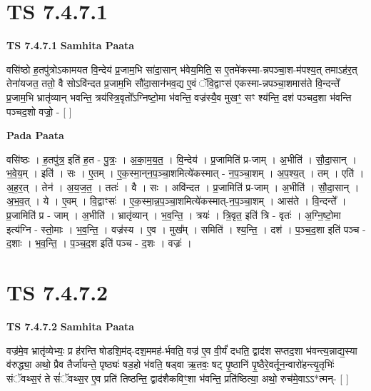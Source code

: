 \documentclass[17pt]{extarticle}
\begin{document}

\section{ TS 7.4.7.1 }

\textbf{TS 7.4.7.1 } \newline
\textbf{Samhita Paata} \newline

वसि॑ष्ठो ह॒तपु॑त्रोऽकामयत वि॒न्देय॑ प्र॒जाम॒भि सा॑दा॒सान् भ॑वेय॒मिति॒ स ए॒तमे॑कस्मा-न्नपञ्चा॒श-म॑पश्य॒त् तमाऽह॑र॒त् तेना॑यजत॒ ततो॒ वै सोऽवि॑न्दत प्र॒जाम॒भि सौ॑दा॒सान॑भव॒द्य ए॒वं ॅवि॒द्वाꣳस॑ एकस्मा-न्नपञ्चा॒शमास॑ते वि॒न्दन्ते᳚ प्र॒जाम॒भि भ्रातृ॑व्यान् भवन्ति॒ त्रय॑स्त्रि॒वृतो᳚ऽग्निष्टो॒मा भ॑वन्ति॒ वज्र॑स्यै॒व मुखꣳ॒॒ सꣳ श्य॑न्ति॒ दश॑ पञ्चद॒शा भ॑वन्ति पञ्चद॒शो वज्रो॒ - [  ] \newline

\textbf{Pada Paata} \newline

वसि॑ष्ठः । ह॒तपु॑त्र॒ इति॑ ह॒त - पु॒त्रः॒ । अ॒का॒म॒य॒त॒ । वि॒न्देय॑ । प्र॒जामिति॑ प्र-जाम् । अ॒भीति॑ । सौ॒दा॒सान् । भ॒वे॒य॒म् । इति॑ । सः । ए॒तम् । ए॒क॒स्मा॒न्‌न॒प॒ञ्चा॒शमित्ये॑कस्मात् - न॒प॒ञ्चा॒शम् । अ॒प॒श्य॒त् । तम् । एति॑ । अ॒ह॒र॒त् । तेन॑ । अ॒य॒ज॒त॒ । ततः॑ । वै । सः । अवि॑न्दत । प्र॒जामिति॑ प्र-जाम् । अ॒भीति॑ । सौ॒दा॒सान् । अ॒भ॒व॒त् । ये । ए॒वम् । वि॒द्वाꣳसः॑ । ए॒क॒स्मा॒न्न॒प॒ञ्चा॒शमित्ये॑कस्मात्-न॒प॒ञ्चा॒शम् । आस॑ते । वि॒न्दन्ते᳚ । प्र॒जामिति॑ प्र - जाम् । अ॒भीति॑ । भ्रातृ॑व्यान् । भ॒व॒न्ति॒ । त्रयः॑ । त्रि॒वृत॒ इति॑ त्रि - वृतः॑ । अ॒ग्नि॒ष्टो॒मा इत्य॑ग्नि - स्तो॒माः । भ॒व॒न्ति॒ । वज्र॑स्य । ए॒व । मुख᳚म् । समिति॑ । श्य॒न्ति॒ । दश॑ । प॒ञ्च॒द॒शा इति॑ पञ्च - द॒शाः । भ॒व॒न्ति॒ । प॒ञ्च॒द॒श इति॑ पञ्च - द॒शः । वज्रः॑ ।  \newline





\section{ TS 7.4.7.2 }

\textbf{TS 7.4.7.2 } \newline
\textbf{Samhita Paata} \newline

वज्र॑मे॒व भ्रातृ॑व्येभ्यः॒ प्र ह॑रन्ति षोडशि॒म॑द्-दश॒ममह॑-र्भवति॒ वज्र॑ ए॒व वी॒र्यं॑ दधति॒ द्वाद॑श सप्तद॒शा भ॑वन्त्य॒न्नाद्य॒स्या व॑रुद्ध्या॒ अथो॒ प्रैव तैर्जा॑यन्ते॒ पृष्ठ्यः॑ षड॒हो भ॑वति॒ षड्वा ऋ॒तवः॒ षट् पृ॒ष्ठानि॑ पृ॒ष्ठैरे॒वर्तून॒न्वारो॑हन्त्यृ॒तृभिः॑ संॅवथ्स॒रं ते सं॑ॅवथ्स॒र ए॒व प्रति॑ तिष्ठन्ति॒ द्वाद॑शैकविꣳ॒॒शा भ॑वन्ति॒ प्रति॑ष्ठित्या॒ अथो॒ रुच॑मे॒वाऽऽ*त्मन्- [  ] \newline
\end{document}
